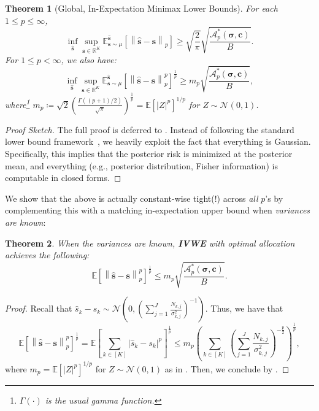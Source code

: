 \documentclass{article}
\def\vc{{\bm{c}}}
\def\vs{{\bm{s}}}
\def\gA{{\mathcal{A}}}
\def\gN{{\mathcal{N}}}
\def\sR{{\mathbb{R}}}
\newcommand{\E}{\mathbb{E}}
\theoremstyle{plain}
\newtheorem{theorem}{Theorem}[section]
\theoremstyle{definition}
\theoremstyle{plain}
\newcommand{\bignorm}[1]{\left\lVert #1 \right\rVert}
\begin{document}
\begin{theorem}[Global, In-Expectation Minimax Lower Bounds]
\label{thm:gaussian-global-exp-lower}
    For each $1 \leq p \leq \infty$,
    \begin{equation}
        \inf_{\hat{\vs}} \sup_{\vs \in \sR^K} \E^{\hat{\vs}}_{\vs \sim \mu}\left[ \bignorm{\hat{\vs} - \vs}_p \right] \geq \sqrt{\frac{2}{\pi}} \sqrt{\frac{\gA_p^*(\bm\sigma, \vc)}{B}}.
    \end{equation}
    For $1 \leq p < \infty$, we also have:
    \begin{equation}
        \inf_{\hat{\vs}} \sup_{\vs \in \sR^K} \E^{\hat{\vs}}_{\vs \sim \mu}\left[ \bignorm{\hat{\vs} - \vs}_p^p \right]^{\frac{1}{p}} \geq m_p \sqrt{\frac{\gA_p^*(\bm\sigma, \vc)}{B}},
    \end{equation}
    where\footnote{$\Gamma(\cdot)$ is the usual gamma function.} $m_p \coloneq \sqrt{2} \left( \frac{\Gamma((p+1)/2)}{\sqrt{\pi}} \right)^{\frac{1}{p}} = \E[|Z|^p]^{1/p}$ for $Z \sim \gN(0, 1)$.
\end{theorem}
\begin{proof}[Proof Sketch]
    The full proof is deferred to .
    Instead of following the standard lower bound framework~\citep{yu1997lecam,tsybakov}, we heavily exploit the fact that everything is Gaussian.
    Specifically, this implies that the posterior risk is minimized at the posterior mean, and everything (e.g., posterior distribution, Fisher information) is computable in closed forms.
\end{proof}

We show that the above is actually constant-wise tight(!) across \emph{all} $p$'s by complementing this with a matching in-expectation upper bound when \emph{variances are known}:
\begin{theorem}
\label{thm:in-exp-upper-bound-known}
    When the variances are \emph{known}, \textbf{IVWE} with optimal allocation achieves the following:
    \begin{equation}
        \E\left[ \bignorm{\hat{\vs} - \vs}_p^p \right]^{\frac{1}{p}} \leq m_p \sqrt{\frac{\gA_p^*(\bm\sigma, \vc)}{B}}.
    \end{equation}
\end{theorem}
\begin{proof}
    Recall that $\hat{s}_k - s_k \sim \gN\left( 0, \left( \sum_{j=1}^J \frac{N_{k,j}}{\sigma_{k,j}^2} \right)^{-1} \right)$.
    Thus, we have that
    \begin{equation}
        \E\left[ \bignorm{\hat{\vs} - \vs}_p^p \right]^{\frac{1}{p}} = \mathbb{E} \left[ \sum_{k\in[K]} |\hat{s}_k - s_k|^p \right]^{\frac{1}{p}} \leq m_p \left( \sum_{k \in [K]} \left( \sum_{j=1}^J \frac{N_{k,j}}{\sigma_{k,j}^2} \right)^{-\frac{p}{2}} \right)^{\frac{1}{p}},
    \end{equation}
    where $m_p = \E[|Z|^p]^{1/p}$ for $Z \sim \gN(0, 1)$ as in .
    Then, we conclude by .
\end{proof}
\end{document}

